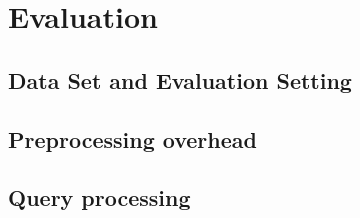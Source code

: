 \chapter{Evaluation}\label{sec:evaluation}


\section{Data Set and Evaluation Setting}


\section{Preprocessing overhead}\label{sec:preprocess}


\section{Query processing}\label{sec:preprocess}

